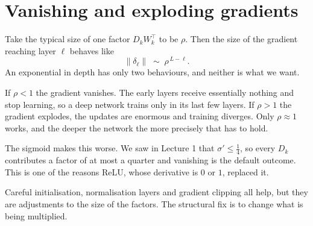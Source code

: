 \documentclass[11pt]{article}
\begin{document}
\section{Vanishing and exploding gradients}

Take the typical size of one factor $D_k W_k^{\top}$ to be $\rho$. Then the size of the
gradient reaching layer $\ell$ behaves like
%
\[
  \|\delta_\ell\| \;\sim\; \rho^{\,L-\ell}.
\]
%
An exponential in depth has only two behaviours, and neither is what we want.

\begin{center}
\end{center}

\noindent
If $\rho < 1$ the gradient vanishes. The early layers receive essentially nothing and stop
learning, so a deep network trains only in its last few layers. If $\rho > 1$ the gradient
explodes, the updates are enormous and training diverges. Only $\rho \approx 1$ works, and
the deeper the network the more precisely that has to hold.

\medskip
\noindent
The sigmoid makes this worse. We saw in Lecture 1 that $\sigma' \le \tfrac14$, so every
$D_k$ contributes a factor of at most a quarter and vanishing is the default outcome. This
is one of the reasons ReLU, whose derivative is $0$ or $1$, replaced it.

\medskip
\noindent
Careful initialisation, normalisation layers and gradient clipping all help, but they are
adjustments to the size of the factors. The structural fix is to change what is being
multiplied.
\end{document}
